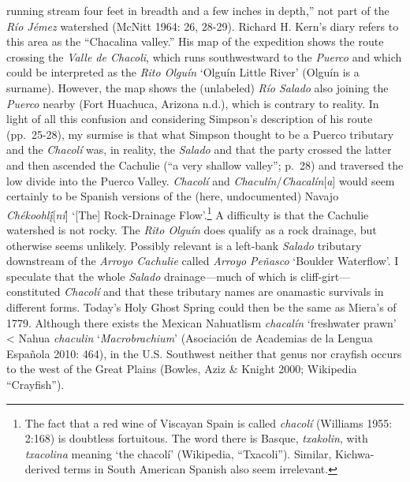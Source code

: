 running stream four feet in breadth and a few inches in depth,” not part of the \textit{Río Jémez} watershed (McNitt 1964: 26, 28-29).  Richard H. Kern’s diary refers to this area as the “Chacalina valley.”  His map of the expedition shows the route crossing the \textit{Valle de Chacoli}, which runs southwestward to the \textit{Puerco} and which could be interpreted as the \textit{Rito Olguín} ‘Olguín Little River’ (Olguín is a surname).  However, the map shows the (unlabeled) \textit{Río Salado} also joining the \textit{Puerco} nearby (Fort Huachuca, Arizona n.d.), which is contrary to reality.  In light of all this confusion and considering Simpson’s description of his route (pp.\ 25-28), my surmise is that what Simpson thought to be a Puerco tributary and the \textit{Chacolí} was, in reality, the \textit{Salado} and that the party crossed the latter and then ascended the Cachulie (“a very shallow valley”; p.\ 28) and traversed the low  divide into the Puerco Valley.  \textit{Chacolí} and \textit{Chaculín}/\textit{Chacalín}[\textit{a}] would seem certainly to be Spanish versions of the (here, undocumented) Navajo \textit{Chékoohl\'{\k{i}}}[\textit{ní}]\textit{ }‘[The] Rock-Drainage Flow’.\footnote{The fact that a red wine of Viscayan Spain is called \textit{chacolí} (Williams 1955: 2:168) is doubtless fortuitous.  The word there is Basque, \textit{txakolin}, with \textit{txacolina} meaning ‘the chacolí’ (Wikipedia, “Txacoli”).  Similar, Kichwa-derived terms in South American Spanish also seem irrelevant.} A difficulty is that the Cachulie watershed is not rocky.  The \textit{Rito Olguín} does qualify as a rock drainage, but otherwise seems unlikely. Possibly relevant is a left-bank \textit{Salado }tributary downstream of the \textit{Arroyo Cachulie }called \textit{Arroyo Peñasco} ‘Boulder Waterflow’.  I speculate that the whole \textit{Salado} drainage—much of which is cliff-girt—constituted \textit{Chacolí} and that these tributary names are onamastic survivals in different forms.  Today’s Holy Ghost Spring\textit{ }could then be the same as Miera’s of 1779.  Although there exists the Mexican Nahuatlism \textit{chacalín} ‘freshwater prawn’ {\textless} Nahua \textit{chaculin} ‘\textit{Macrobrachium}’ (Asociación de Academias de la Lengua Española 2010: 464), in the U.S. Southwest neither that genus nor crayfish occurs to the west of the Great Plains (Bowles, Aziz \& Knight 2000; Wikipedia “Crayfish”).


